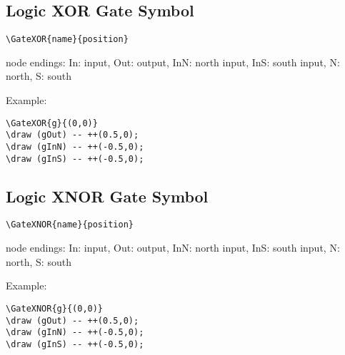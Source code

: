 \documentclass[parskip=full]{scrartcl}
\begin{document}
\subsection{Logic XOR Gate Symbol}

\begin{verbatim}
\GateXOR{name}{position}
\end{verbatim}
node endings: In: input, Out: output,
              InN: north input, InS: south input,
              N: north, S: south

Example:\\
\begin{minipage}{0.8\textwidth}
\begin{verbatim}
\GateXOR{g}{(0,0)}
\draw (gOut) -- ++(0.5,0);
\draw (gInN) -- ++(-0.5,0);
\draw (gInS) -- ++(-0.5,0);
\end{verbatim}
\end{minipage}
\begin{minipage}{0.19\textwidth}
\end{minipage}

\subsection{Logic XNOR Gate Symbol}

\begin{verbatim}
\GateXNOR{name}{position}
\end{verbatim}
node endings: In: input, Out: output,
              InN: north input, InS: south input,
              N: north, S: south

Example:\\
\begin{minipage}{0.8\textwidth}
\begin{verbatim}
\GateXNOR{g}{(0,0)}
\draw (gOut) -- ++(0.5,0);
\draw (gInN) -- ++(-0.5,0);
\draw (gInS) -- ++(-0.5,0);
\end{verbatim}
\end{minipage}
\begin{minipage}{0.19\textwidth}
\end{minipage}
\end{document}
